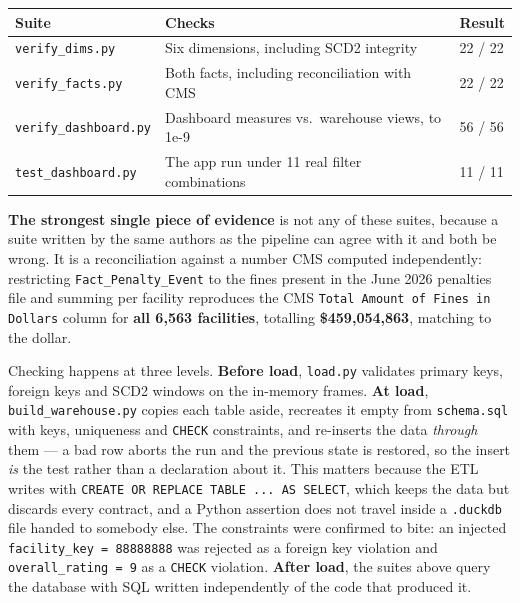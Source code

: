 \documentclass[11pt,a4paper]{article}
\newcommand{\sansall}{\sffamily}
\newcommand{\code}[1]{\texttt{#1}}
\begin{document}
\begin{goodbox}[title={Verification results, all re-run for this report}]
\begin{tabular}{@{}L{5.0cm} L{7.4cm} R{2.2cm}@{}}
\toprule
\sansall\bfseries Suite & \sansall\bfseries Checks & \sansall\bfseries Result \\
\midrule
\code{verify\_dims.py} & Six dimensions, including SCD2 integrity & 22 / 22 \\
\code{verify\_facts.py} & Both facts, including reconciliation with CMS & 22 / 22 \\
\code{verify\_dashboard.py} & Dashboard measures vs.\ warehouse views, to 1e-9 & 56 / 56 \\
\code{test\_dashboard.py} & The app run under 11 real filter combinations & 11 / 11 \\
\bottomrule
\end{tabular}

\vspace{0.5em}
\textbf{The strongest single piece of evidence} is not any of these suites,
because a suite written by the same authors as the pipeline can agree with it
and both be wrong. It is a reconciliation against a number CMS computed
independently: restricting \code{Fact\_Penalty\_Event} to the fines present in
the June 2026 penalties file and summing per facility reproduces the CMS
\code{Total Amount of Fines in Dollars} column for \textbf{all 6{,}563
facilities}, totalling \textbf{\$459{,}054{,}863}, matching to the dollar.
\end{goodbox}

Checking happens at three levels. \textbf{Before load}, \code{load.py}
validates primary keys, foreign keys and SCD2 windows on the in-memory frames.
\textbf{At load}, \code{build_warehouse.py} copies each table aside, recreates
it empty from \code{schema.sql} with keys, uniqueness and \code{CHECK}
constraints, and re-inserts the data \emph{through} them — a bad row aborts the
run and the previous state is restored, so the insert \emph{is} the test rather
than a declaration about it. This matters because the ETL writes with
\code{CREATE OR REPLACE TABLE ... AS SELECT}, which keeps the data but discards
every contract, and a Python assertion does not travel inside a \code{.duckdb}
file handed to somebody else. The constraints were confirmed to bite: an
injected \code{facility_key = 88888888} was rejected as a foreign key violation
and \code{overall_rating = 9} as a \code{CHECK} violation. \textbf{After load},
the suites above query the database with SQL written independently of the code
that produced it.
\end{document}
